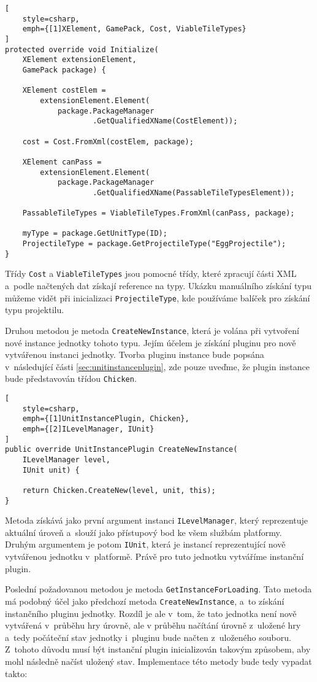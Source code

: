 \begin{lstlisting}[
	style=csharp,
	emph={[1]XElement, GamePack, Cost, ViableTileTypes}
]
protected override void Initialize(
	XElement extensionElement, 
	GamePack package) {
	
	XElement costElem =
		extensionElement.Element(
			package.PackageManager
			   	    .GetQualifiedXName(CostElement));
			   
	cost = Cost.FromXml(costElem, package);

	XElement canPass =
		extensionElement.Element(
			package.PackageManager
			   	    .GetQualifiedXName(PassableTileTypesElement));
			   
	PassableTileTypes = ViableTileTypes.FromXml(canPass, package);

	myType = package.GetUnitType(ID);
	ProjectileType = package.GetProjectileType("EggProjectile");
}
\end{lstlisting}

Třídy \texttt{Cost} a \texttt{ViableTileTypes} jsou pomocné třídy, které zpracují části XML a~podle načtených dat získají reference na typy. Ukázku manuálního získání typu můžeme vidět při inicializaci \texttt{ProjectileType}, kde používáme balíček pro získání typu projektilu.


Druhou metodou je metoda \texttt{CreateNewInstance}, která je volána při vytvoření nové instance jednotky tohoto typu. Jejím účelem je získání pluginu pro nově vytvářenou instanci jednotky. Tvorba pluginu instance bude popsána v~následující části \ref{sec:unitinstanceplugin}, zde pouze uveďme, že plugin instance bude představován třídou \texttt{Chicken}.


\begin{lstlisting}[
	style=csharp,
	emph={[1]UnitInstancePlugin, Chicken},
	emph={[2]ILevelManager, IUnit}
]
public override UnitInstancePlugin CreateNewInstance(
	ILevelManager level, 
	IUnit unit) {
	
	return Chicken.CreateNew(level, unit, this);
}
\end{lstlisting}
Metoda získává jako první argument instanci \texttt{ILevelManager}, který reprezentuje aktuální úroveň a~slouží jako přístupový bod ke všem službám platformy. Druhým argumentem je potom \texttt{IUnit}, která je instancí reprezentující nově vytvářenou jednotku v~platformě. Právě pro tuto jednotku vytváříme instanční plugin.


Poslední požadovanou metodou je metoda \texttt{GetInstanceForLoading}. Tato metoda má podobný účel jako předchozí metoda \texttt{CreateNewInstance}, a~to získání instančního pluginu jednotky. Rozdíl je ale v~tom, že tato jednotka není nově vytvářená v~průběhu hry úrovně, ale v průběhu načítání úrovně z~uložené hry a~tedy počáteční stav jednotky i~pluginu bude načten z~uloženého souboru. Z~tohoto důvodu musí být instanční plugin inicializován takovým způsobem, aby mohl následně načíst uložený stav. Implementace této metody bude tedy vypadat takto:

